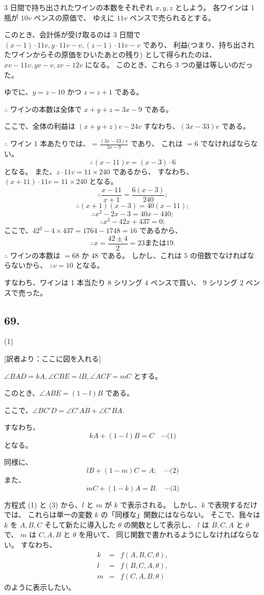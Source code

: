 3 日間で持ち出されたワインの本数をそれぞれ $x, y, z$
としよう。
各ワインは 1 瓶が $10 v$ ペンスの原価で、
ゆえに $11v$ ペンスで売られるとする。

このとき、会計係が受け取るのは 3 日間で
$(x - 1) \cdot 11 v, y \cdot 11 v - v, (z - 1) \cdot 11 v - v$
であり、
利益(つまり、持ち出されたワインからその原価をひいたあとの残り)
として得られたのは、
$xv - 11v, yv - v, zv - 12v$
になる。
このとき、これら 3 つの量は等しいのだった。

ゆでに、$y = z - 10$ かつ $z = z + 1$ である。

$\therefore$ ワインの本数は全体で $x + y + z = 3x - 9$
である。

ここで、全体の利益は $(x + y + z) v - 24v$
すなわち、$(3x - 33)v$ である。

$\therefore$
ワイン 1 本あたりでは、$= \frac{(3x-33)v}{3x-9}$ であり、
これは $=6$ でなければならない。
\[
\therefore
(x - 11) v = (x - 3) \cdot 6
\]
となる。
また、$z \cdot 11v = 11 \times 240$ であるから、
すなわち、$(x + 11) \cdot 11v = 11 \times 240$ となる。
\[
\therefore
\frac{x - 11}{x + 1} = \frac{6(x - 3)}{240};
\]
\[
\therefore
(x + 1)(x - 3) = 40(x - 11);
\]
\[
\therefore
x^2 - 2x - 3 = 40x - 440;
\]
\[
\therefore
x^2 - 42x + 437 = 0;
\]
ここで、$42^2 - 4 \times 437 = 1764 - 1748 = 16$ であるから、
\[
\therefore
x = \frac{42 \pm 4}{2} = 23 \mbox{または} 19.
\]
$\therefore$ ワインの本数は $= 68$ か $48$ である。
しかし、これは $5$ の倍数でなければならないから、
$\therefore v = 10$ となる。

すなわち、ワインは 1 本当たり $8$ シリング $4$ ペンスで買い、
$9$ シリング $2$ ペンスで売った。

\subsection*{69.}

(1)

[訳者より：ここに図を入れる] 

$\angle BAD = k A, \angle CBE = l B, \angle ACF = m C$
とする。

このとき、$\angle ABE = (1 - l) B$ である。

ここで、$\angle BC'D = \angle C'AB + \angle C'BA$.

すなわち、
\[
k A + (1 - l) B = C
\quad \cdots \mbox{(1)}
\]
となる。

同様に、
\[
l B + (1 - m) C = A;
\quad \cdots \mbox{(2)}
\]
また、
\[
m C + (1 - k) A = B.
\quad \cdots \mbox{(3)}
\]

方程式 (1) と (3) から、$l$ と $m$ が $k$ で表示される。
しかし、$k$ で表現するだけでは、
これらは単一の変数 $k$ の「同様な」関数にはならない。
そこで、我々は $k$ を $A, B, C$ そして新たに導入した $\theta$ 
の関数として表示し、
$l$ は $B, C, A$ と $\theta$ で、
$m$ は $C, A, B$ と $\theta$ を用いて、
同じ関数で書かれるようにしなければならない。
すなわち、
\begin{eqnarray*}
k &=& f(A, B, C, \theta),\\
l &=& f(B, C, A, \theta),\\
m &=& f(C, A, B, \theta)
\end{eqnarray*}
のように表示したい。


